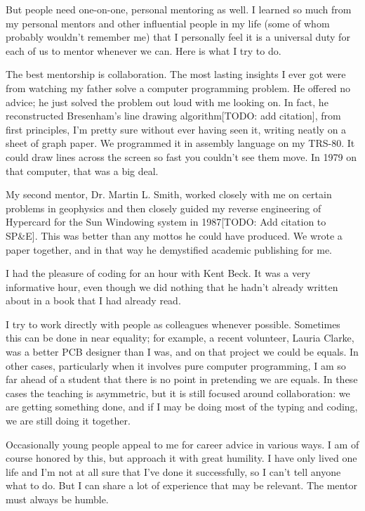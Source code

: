 \documentclass[
	fontsize=10pt, %
	twoside=false, %
	secnumdepth=1, %
]{kaobook}
\begin{document}
But people need one-on-one, personal mentoring as well. I learned so
much from my personal mentors and other influential people in my life
(some of whom probably wouldn’t remember me) that I personally feel it
is a universal duty for each of us to mentor whenever we can.
Here is what I try to do.

The best mentorship is collaboration. The most lasting insights I ever
got were from watching my father solve a computer programming
problem. He offered no advice; he just solved the problem out loud
with me looking on. In fact, he reconstructed Bresenham’s line drawing
algorithm[TODO: add citation], from first
principles, I’m pretty sure without ever having seen it, writing neatly on a sheet of graph paper.
We programmed it in assembly language on my TRS-80. It could draw lines across the
screen so fast you couldn’t see them move. In 1979 on that computer,
that was a big deal.

My second mentor, Dr. Martin L. Smith, worked closely with me on
certain problems in geophysics and then closely guided my reverse
engineering of Hypercard for the Sun Windowing system in 1987[TODO: Add citation to SP\&E]. This
was better than any mottos he could have produced. We wrote a paper
together, and in that way he demystified academic publishing for me.

I had the pleasure of coding for an hour with Kent Beck. It was a very
informative hour, even though we did nothing that he hadn’t already
written about in a book that I had already read.

I try to work directly with people as colleagues whenever
possible. Sometimes this can be done in near equality; for example, a
recent volunteer, Lauria Clarke, was a better PCB designer than I was,
and on that project we could be equals. In other cases, particularly
when it involves pure computer programming, I am so far ahead of a
student that there is no point in pretending we are equals. In these
cases the teaching is asymmetric, but it is still focused around
collaboration: we are getting something done, and if I may be
doing most of the typing and coding, we are still doing it together.

Occasionally young people appeal to me for career advice in various
ways. I am of course honored by this, but approach it with great
humility. I have only lived one life and I’m not at all sure that I’ve
done it successfully, so I can’t tell anyone what to do. But I can
share a lot of experience that may be relevant. The mentor must always
be humble.
\end{document}
